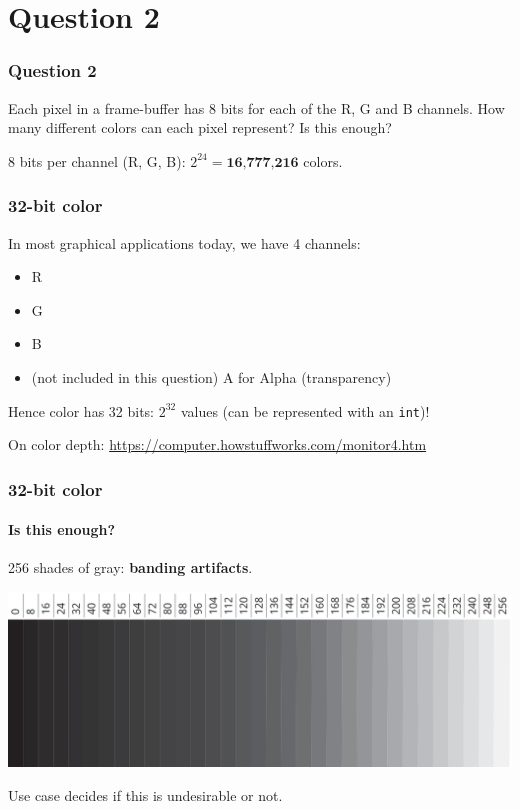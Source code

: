 \documentclass{beamer}
\begin{document}
\section{Question 2}

\begin{frame}
    \frametitle{Question 2}

    Each pixel in a frame-buffer has 8 bits for each of the R, G and B channels. How many different
    colors can each pixel represent? Is this enough?

    \begin{tcolorbox}
        8 bits per channel (R, G, B): $2^{24} = \textbf{16,777,216}$ colors. 
    \end{tcolorbox}

\end{frame}

\begin{frame}
    \frametitle{32-bit color}

    In most graphical applications today, we have 4 channels:
    \begin{itemize}
        \item R
        \item G
        \item B
        \item (not included in this question) A for Alpha (transparency)
    \end{itemize}

    Hence color has 32 bits: $2^{32}$ values (can be represented with an \texttt{int})!

    On color depth: \url{https://computer.howstuffworks.com/monitor4.htm}

\end{frame}

\begin{frame}
    \frametitle{32-bit color}
    \framesubtitle{Is this enough?}

    256 shades of gray: \textbf{banding artifacts}.

    \begin{center}
        \includegraphics[scale=0.25]{greyscale-levels.png}
    \end{center}

    Use case decides if this is undesirable or not.

\end{frame}
\end{document}
